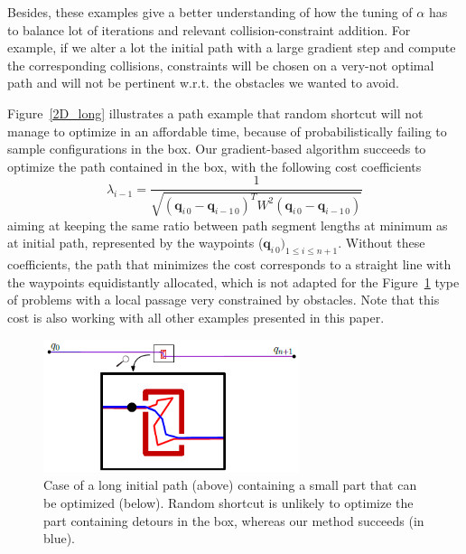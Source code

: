 \documentclass{tADR2e}
\newcommand\conf{\mathbf{q}}
\newcommand\weight{W}
\begin{document}
Besides, these examples give a better understanding of how the tuning of $\alpha$ 
has to balance lot of iterations and relevant collision-constraint addition. For 
example, if we alter a lot the initial path with a large gradient step and 
compute the corresponding collisions, constraints will be chosen on a very-not 
optimal path and will not be pertinent w.r.t. the obstacles we wanted to 
avoid.

Figure~\ref{2D_long} illustrates a path example that random shortcut will not manage to 
optimize in an affordable time, because of probabilistically failing to sample 
configurations in the box. Our gradient-based algorithm succeeds to optimize the 
path contained in the box, with the following cost coefficients 
$$
\lambda_{i-1} = \frac{1}{\sqrt{(\conf_{i\,0}-\conf_{i-1\,0})^T \weight^2 
(\conf_{i\,0}-\conf_{i-1\,0})}}
$$
aiming at keeping the same ratio between path segment lengths at 
minimum as at 
initial path, represented by the waypoints ($\conf_{i\,0})_{1\leq i\leq n+1}$.
Without these coefficients, the path that minimizes the cost corresponds to a 
straight line with the waypoints equidistantly allocated, which is not adapted for 
the Figure~\ref{local_box_optim} type of problems with a local passage very
constrained by obstacles. Note that this cost is also working with all other 
examples presented in this paper.


\begin{figure}[t]
	\centering
	\includegraphics[width=7.5cm]{local_box_optim.png}
	\caption{Case of a long initial path (above) containing a small part that can 
	be optimized (below). Random shortcut is unlikely to optimize the part containing detours in the box, whereas our method 
	succeeds (in blue).}
	\label{local_box_optim}
\end{figure}
\end{document}
